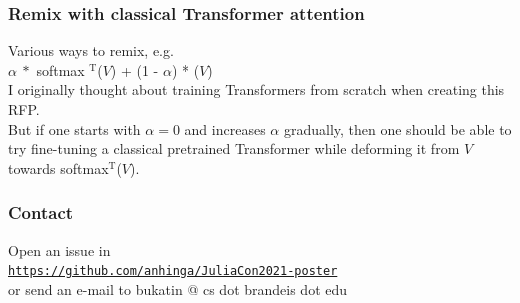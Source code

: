 \documentclass{beamer}
\newcommand{\msmagenta}[1]{{\color{mymagenta} #1}}
\begin{document}
\begin{frame}

\frametitle{Remix with classical Transformer attention}

Various ways to remix, e.g.\\[4ex]


{\LARGE $\alpha\ *$ softmax\msmagenta{$^\text{T}$}($V$) + (1 - $\alpha$) * ($V$)}\\[4ex]


I originally thought about training Transformers from scratch when creating this RFP.\\[4ex]

But if one starts with $\alpha=0$ and increases $\alpha$ gradually, then one should be able
to try fine-tuning a classical pretrained Transformer while deforming it from $V$ towards \msmagenta{softmax$^\text{T}$}($V$).


\end{frame}

\begin{frame}

\frametitle{Contact}

Open an issue in\\[2ex]

\href{https://github.com/anhinga/JuliaCon2021-poster}{\tt https://github.com/anhinga/JuliaCon2021-poster}\\[2ex]


or send an e-mail to bukatin @ cs dot brandeis dot edu



\end{frame}
\end{document}
